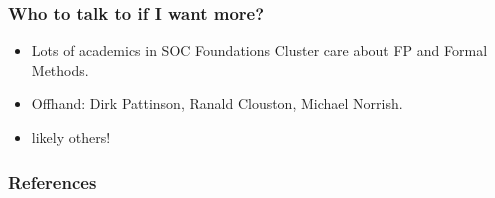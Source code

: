 \documentclass[hyperref={colorlinks = true,linkcolor = blue, citecolor = blue, urlcolor = blue}]{beamer}
\begin{document}
\begin{frame}[fragile]
  \frametitle{Who to talk to if I want more?}
  \begin{itemize}
    \item Lots of academics in SOC Foundations Cluster care 
          about FP and Formal Methods.
    \item Offhand: Dirk Pattinson, Ranald Clouston, Michael Norrish.
    \item likely others!
  \end{itemize}
\end{frame}

\begin{frame}[fragile]
\frametitle{References}
{}
\end{frame}
\end{document}
